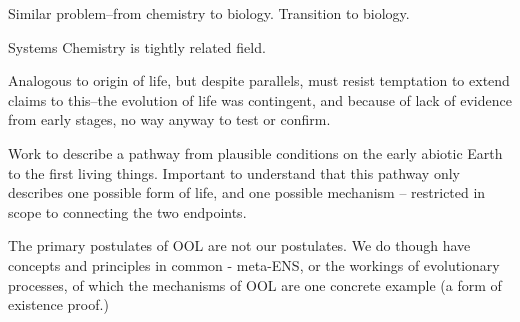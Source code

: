 Similar problem--from chemistry to biology. Transition to biology.

Systems Chemistry is tightly related field.

Analogous to origin of life, but despite parallels, must resist temptation to extend claims to this--the evolution of life was contingent, and because of lack of evidence from early stages, no way anyway to test or confirm.

Work to describe a pathway from plausible conditions on the early abiotic Earth to the first living things. Important to understand that this pathway only describes one possible form of life, and one possible mechanism -- restricted in scope to connecting the two endpoints.

The primary postulates of OOL are not our postulates. We do though have concepts and principles in common - meta-ENS, or the workings of evolutionary processes, of which the mechanisms of OOL are one concrete example (a form of existence proof.)

